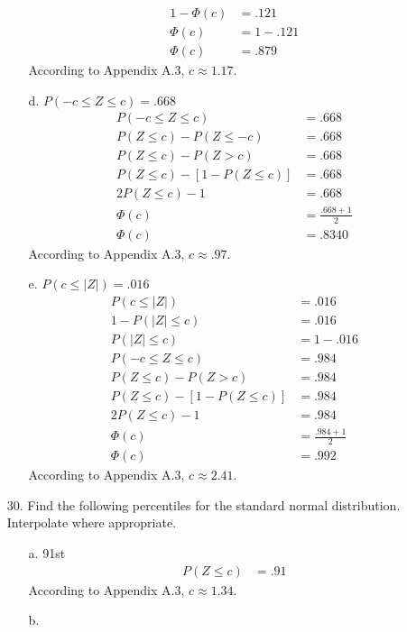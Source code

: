 \documentclass[letterpaper,12pt]{article}
\begin{document}
\begin{enumerate}
\begin{enumerate}
\begin{align*}
          1 - \Phi(c) &= .121 \\
          \Phi(c) &= 1 - .121 \\
          \Phi(c) &= .879
        \end{align*}
        According to Appendix A.3, $c \approx 1.17$.
      \item[d.]
        $P(-c \le Z \le c) = .668$
        \begin{align*}
          P(-c \le Z \le c) &= .668 \\
          P(Z \le c) - P(Z \le -c) &= .668 \\
          P(Z \le c) - P(Z > c) &= .668 \\
          P(Z \le c) - [1 - P(Z \le c)] &= .668 \\
          2P(Z \le c) - 1 &= .668 \\
          \Phi(c) &= \frac{.668 + 1}{2} \\
          \Phi(c) &= .8340
        \end{align*}
        According to Appendix A.3, $c \approx .97$.
      \item[e.]
        $P(c \le |Z|) = .016$
        \begin{align*}
          P(c \le |Z|) &= .016 \\
          1 - P(|Z| \le c) &= .016 \\
          P(|Z| \le c) &= 1 - .016 \\
          P(-c \le Z \le c) &= .984 \\
          P(Z \le c) - P(Z > c) &= .984 \\
          P(Z \le c) - [1 - P(Z \le c)] &= .984 \\
          2P(Z \le c) - 1 &= .984 \\
          \Phi(c) &= \frac{.984 + 1}{2} \\
          \Phi(c) &= .992
        \end{align*}
        According to Appendix A.3, $c \approx 2.41$.
    \end{enumerate}
  \item[30.]
    Find the following percentiles for the standard normal distribution. Interpolate where appropriate.
    \begin{enumerate}
      \item[a.]
        91st
        \begin{align*}
          P(Z \le c) &= .91
        \end{align*}
        According to Appendix A.3, $c \approx 1.34$.
      \item[b.]

\end{enumerate}
\end{enumerate}
\end{document}
